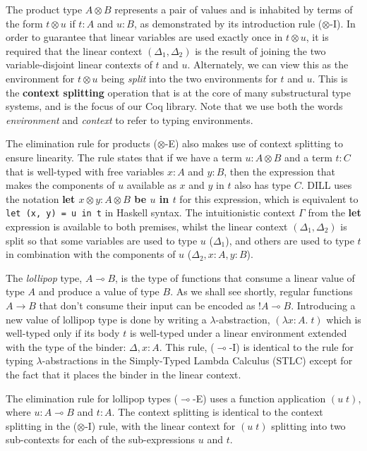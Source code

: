 \documentclass[]{unswthesis}
\newcommand{\lolly}{\multimap}
\let\c\texttt
\let\i\textit
\let\b\textbf
\begin{document}
The product type $A \otimes B$ represents a pair of values and is inhabited by terms of the form $t \otimes u$ if $t : A$ and $u : B$, as demonstrated by its introduction rule ($\otimes$-I). In order to guarantee that linear variables are used exactly once in $t \otimes u$, it is required that the linear context $(\Delta_1, \Delta_2)$ is the result of joining the two variable-disjoint linear contexts of $t$ and $u$. Alternately, we can view this as the environment for $t \otimes u$ being \i{split} into the two environments for $t$ and $u$. This is the \b{context splitting} operation that is at the core of many substructural type systems, and is the focus of our Coq library. Note that we use both the words \i{environment} and \i{context} to refer to typing environments.

The elimination rule for products ($\otimes$-E) also makes use of context splitting to ensure linearity. The rule states that if we have a term $u : A \otimes B$ and a term $t : C$ that is well-typed with free variables $x : A$ and $y : B$, then the expression that makes the components of $u$ available as $x$ and $y$ in $t$ also has type $C$. DILL uses the notation \b{let $x \otimes y : A \otimes B$ be $u$ in $t$} for this expression, which is equivalent to \c{let (x, y) = u in t} in Haskell syntax. The intuitionistic context $\Gamma$ from the \b{let} expression is available to both premises, whilst the linear context $(\Delta_1, \Delta_2)$ is split so that some variables are used to type $u$ ($\Delta_1$), and others are used to type $t$ in combination with the components of $u$ ($\Delta_2, x : A, y : B$).

The \i{lollipop} type, $A \lolly B$, is the type of functions that consume a linear value of type $A$ and produce a value of type $B$. As we shall see shortly, regular functions $A \to B$ that don't consume their input can be encoded as $!A \lolly B$. Introducing a new value of lollipop type is done by writing a $\lambda$-abstraction, $(\lambda x : A. \; t)$ which is well-typed only if its body $t$ is well-typed under a linear environment extended with the type of the binder: $\Delta, x : A$. This rule, ($\lolly$-I) is identical to the rule for typing $\lambda$-abstractions in the Simply-Typed Lambda Calculus (STLC) except for the fact that it places the binder in the linear context.

The elimination rule for lollipop types ($\lolly$-E) uses a function application $(u \; t)$, where $u : A \lolly B$ and $t : A$. The context splitting is identical to the context splitting in the ($\otimes$-I) rule, with the linear context for $(u \; t)$ splitting into two sub-contexts for each of the sub-expressions $u$ and $t$.
\end{document}
